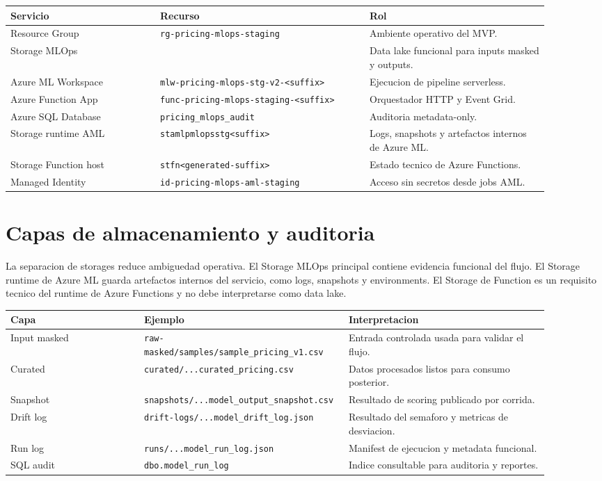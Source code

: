\documentclass[11pt,letterpaper]{article}
\newcommand{\code}[1]{\texttt{\small #1}}
\begin{document}
\begin{longtable}{p{0.25\linewidth}p{0.35\linewidth}p{0.30\linewidth}}
\toprule
\textbf{Servicio} & \textbf{Recurso} & \textbf{Rol}\\
\midrule
\endhead
Resource Group & \code{rg-pricing-mlops-staging} & Ambiente operativo del MVP.\\
Storage MLOps & \code{<mlops-storage-account>} & Data lake funcional para inputs masked y outputs.\\
Azure ML Workspace & \code{mlw-pricing-mlops-stg-v2-<suffix>} & Ejecucion de pipeline serverless.\\
Azure Function App & \code{func-pricing-mlops-staging-<suffix>} & Orquestador HTTP y Event Grid.\\
Azure SQL Database & \code{pricing\_mlops\_audit} & Auditoria metadata-only.\\
Storage runtime AML & \code{stamlpmlopsstg<suffix>} & Logs, snapshots y artefactos internos de Azure ML.\\
Storage Function host & \code{stfn<generated-suffix>} & Estado tecnico de Azure Functions.\\
Managed Identity & \code{id-pricing-mlops-aml-staging} & Acceso sin secretos desde jobs AML.\\
\bottomrule
\end{longtable}

\section*{Capas de almacenamiento y auditoria}

La separacion de storages reduce ambiguedad operativa. El Storage MLOps principal contiene evidencia funcional del flujo. El Storage runtime de Azure ML guarda artefactos internos del servicio, como logs, snapshots y environments. El Storage de Function es un requisito tecnico del runtime de Azure Functions y no debe interpretarse como data lake.

\begin{longtable}{p{0.24\linewidth}p{0.30\linewidth}p{0.36\linewidth}}
\toprule
\textbf{Capa} & \textbf{Ejemplo} & \textbf{Interpretacion}\\
\midrule
\endhead
Input masked & \code{raw-masked/samples/sample\_pricing\_v1.csv} & Entrada controlada usada para validar el flujo.\\
Curated & \code{curated/...\allowbreak curated\_pricing.csv} & Datos procesados listos para consumo posterior.\\
Snapshot & \code{snapshots/...\allowbreak model\_output\_snapshot.csv} & Resultado de scoring publicado por corrida.\\
Drift log & \code{drift-logs/...\allowbreak model\_drift\_log.json} & Resultado del semaforo y metricas de desviacion.\\
Run log & \code{runs/...\allowbreak model\_run\_log.json} & Manifest de ejecucion y metadata funcional.\\
SQL audit & \code{dbo.model\_run\_log} & Indice consultable para auditoria y reportes.\\
\bottomrule
\end{longtable}
\end{document}
